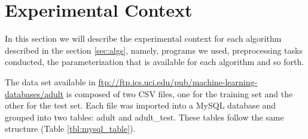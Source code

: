 \documentclass[a4paper]{llncs}
\begin{document}
\section{Experimental Context}

In this section we will describe the experimental context for each
algorithm described in the section \ref{sec:algs}, namely, programs we used,
preprocessing tasks conducted, the parameterization that is available for each
algorithm and so forth.

The data set available in \url{ftp://ftp.ics.uci.edu/pub/machine-learning-databases/adult}
is composed of two CSV files, one for the training set and the other for the test set.
Each file was imported into a MySQL database and grouped into two tables: adult and adult\_test.
These tables follow the same structure (Table \ref{tbl:mysql_table}).
\end{document}
